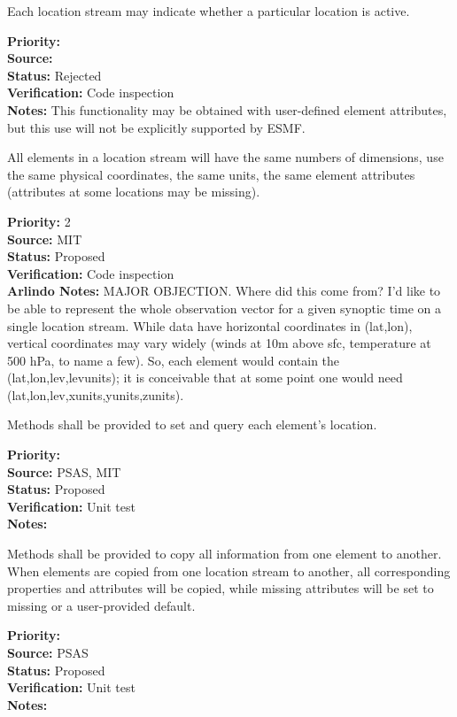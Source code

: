 Each location stream may indicate whether a particular location is active.

\begin{reqlist}
{\bf Priority:} \\
{\bf Source:} \\
{\bf Status:} Rejected \\
{\bf Verification:} Code inspection \\
{\bf Notes:} This functionality may be obtained with user-defined element
attributes, but this use will not be explicitly supported by ESMF.
\end{reqlist}


All elements in a location stream will have the same numbers of dimensions, use the
same physical coordinates, the same units, the same element attributes (attributes at
some locations may be missing).
\begin{reqlist}
{\bf Priority:} 2 \\
{\bf Source:} MIT \\
{\bf Status:} Proposed \\
{\bf Verification:} Code inspection \\
{\bf Arlindo Notes:} MAJOR OBJECTION. Where did this come from? I'd like to be able to represent the whole observation vector for a given synoptic time on a single location stream. While data have horizontal coordinates in (lat,lon), vertical coordinates may vary widely (winds at 10m above sfc, temperature at 500 hPa, to name a few). So, each element would contain the (lat,lon,lev,levunits); it is conceivable that at  some point one would need (lat,lon,lev,xunits,yunits,zunits).
\end{reqlist}

Methods shall be provided to set and query each element's location.
\begin{reqlist}
{\bf Priority:} \\
{\bf Source:} PSAS, MIT\\
{\bf Status:} Proposed \\
{\bf Verification:} Unit test \\
{\bf Notes:} 
\end{reqlist}

Methods shall be provided to copy all information from one element to another. 
When elements are copied from one location stream to another, all corresponding
properties and attributes will be copied, while missing attributes will be
set to missing or a user-provided default.
\begin{reqlist}
{\bf Priority:} \\
{\bf Source:} PSAS\\
{\bf Status:} Proposed \\
{\bf Verification:} Unit test \\
{\bf Notes:} 
\end{reqlist}

